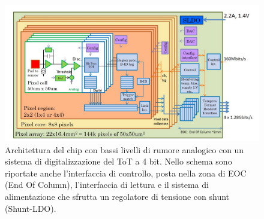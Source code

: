 \begin{figure}
\centering
\includegraphics[scale=0.4]{Immagini/ChipBlockDiagram}
\caption{Architettura del chip con bassi livelli di rumore analogico con un sistema di digitalizzazione del ToT a 4 bit. Nello schema sono riportate anche l'interfaccia di controllo, posta nella zona di EOC (End Of Column), l'interfaccia di lettura e il sistema di alimentazione che sfrutta un regolatore di tensione con shunt (Shunt-LDO).}
\label{ChipBlockDiagram}
\end{figure}

